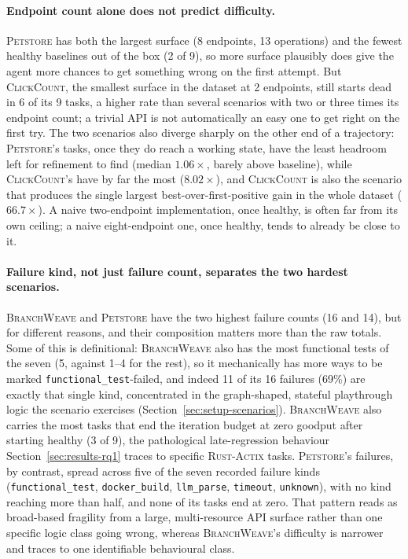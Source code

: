 \paragraph{Endpoint count alone does not predict difficulty.}
\textsc{Petstore} has both the largest surface (8 endpoints, 13
operations) and the fewest healthy baselines out of the box (2 of 9), so
more surface plausibly does give the agent more chances to get something
wrong on the first attempt. But \textsc{ClickCount}, the smallest surface
in the dataset at 2 endpoints, still starts dead in 6 of its 9 tasks, a
higher rate than several scenarios with two or three times its
endpoint count; a trivial API is not automatically an easy one to get
right on the first try. The two scenarios also diverge sharply on the
other end of a trajectory: \textsc{Petstore}'s tasks, once they do reach
a working state, have the least headroom left for refinement to find
(median $1.06\times$, barely above baseline), while \textsc{ClickCount}'s
have by far the most ($8.02\times$), and \textsc{ClickCount} is also the
scenario that produces the single largest best-over-first-positive gain in
the whole dataset ($66.7\times$). A naive two-endpoint
implementation, once healthy, is often far from its own ceiling; a
naive eight-endpoint one, once healthy, tends to already be close to it.

\paragraph{Failure kind, not just failure count, separates the two hardest scenarios.}
\textsc{BranchWeave} and \textsc{Petstore} have the two highest failure
counts (16 and 14), but for different reasons, and their composition
matters more than the raw totals. Some of this is definitional:
\textsc{BranchWeave} also has the most functional tests of the seven (5,
against 1--4 for the rest), so it mechanically has more ways to be marked
\texttt{functional\_test}-failed, and indeed 11 of its 16 failures
(69\%) are exactly that single kind, concentrated in the graph-shaped,
stateful playthrough logic the scenario exercises
(Section~\ref{sec:setup-scenarios}). \textsc{BranchWeave} also carries the
most tasks that end the iteration budget at zero goodput after starting
healthy (3 of 9), the pathological late-regression behaviour
Section~\ref{sec:results-rq1} traces to specific \textsc{Rust-Actix}
tasks. \textsc{Petstore}'s failures, by contrast, spread across five of
the seven recorded failure kinds (\texttt{functional\_test},
\texttt{docker\_build}, \texttt{llm\_parse}, \texttt{timeout},
\texttt{unknown}), with no kind reaching more than half, and none of its
tasks end at zero. That pattern reads as
broad-based fragility from a large, multi-resource API surface rather
than one specific logic class going wrong, whereas \textsc{BranchWeave}'s
difficulty is narrower and traces to one identifiable behavioural class.

